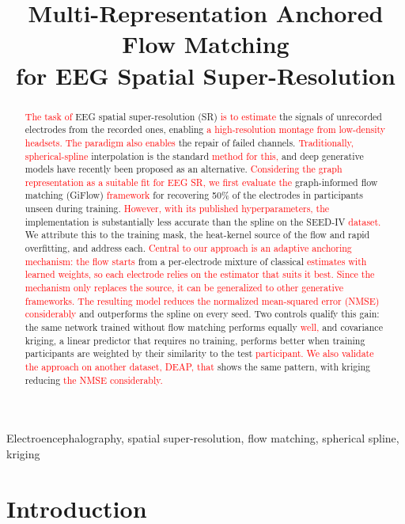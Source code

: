 \documentclass{article}
\title{Multi-Representation Anchored Flow Matching\\
for EEG Spatial Super-Resolution}
\begin{document}
\maketitle

\begin{abstract}
\textcolor{red}{The task of} EEG spatial super-resolution (SR) \textcolor{red}{is to estimate} the signals of
unrecorded electrodes from the recorded ones, enabling \textcolor{red}{a high-resolution
montage from low-density headsets. The paradigm also enables} the repair of
failed channels. \textcolor{red}{Traditionally, spherical-spline} interpolation is the
standard \textcolor{red}{method for this,} and deep generative models have recently been
proposed as an alternative. \textcolor{red}{Considering the graph representation as a
suitable fit for EEG SR, we first evaluate the} graph-informed flow
matching (GiFlow) \textcolor{red}{framework} for recovering 50\% of the electrodes in
participants unseen during training. \textcolor{red}{However, with its published
hyperparameters, the} implementation is substantially less accurate than
the spline on the SEED-IV \textcolor{red}{dataset.} We attribute this to the training mask,
the heat-kernel source of the flow and rapid overfitting, and address each.
\textcolor{red}{Central to our approach is an adaptive anchoring mechanism: the flow
starts} from a per-electrode mixture of classical \textcolor{red}{estimates with learned
weights, so each electrode relies on the estimator that suits it best.
Since the mechanism only replaces the source, it can be generalized to
other generative frameworks. The resulting model reduces the normalized
mean-squared error (NMSE) considerably} and outperforms the spline on every
seed. Two controls qualify this gain: the same network trained without
flow matching performs equally \textcolor{red}{well,} and covariance kriging, a linear
predictor that requires no training, performs better when training
participants are weighted by their similarity to the test \textcolor{red}{participant. We
also validate the approach on another dataset, DEAP, that} shows the same
pattern, with kriging reducing \textcolor{red}{the NMSE considerably.}
\end{abstract}

\begin{keywords}
Electroencephalography, spatial super-resolution, flow matching,
spherical spline, kriging
\end{keywords}

\section{Introduction}
\label{sec:intro}
\end{document}
